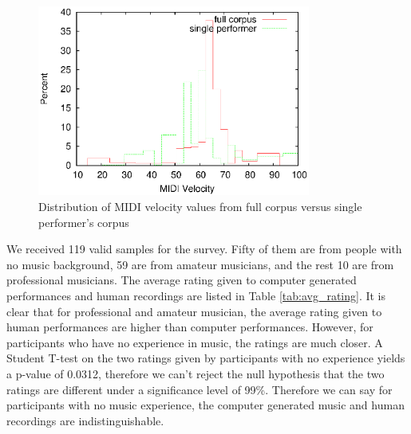 \begin{figure}[tp]
   \begin{center}
      \includegraphics[width=0.8\textwidth]{fig/all_01_velocity}
   \end{center}
   \caption{Distribution of MIDI velocity values from full corpus versus single performer's corpus}
   \label{fig:distvel}
\end{figure}




We received 119 valid samples for the survey. Fifty of them are from people with no music background, 59 are from amateur musicians, and the rest 10 are from professional musicians. The average rating given to computer generated performances and human recordings are listed in Table \ref{tab:avg_rating}. It is clear that for professional and amateur musician, the average rating given to human performances are higher than computer performances. However, for participants who have no experience in music, the ratings are much closer. A Student T-test on the two ratings given by participants with no experience yields a p-value of 0.0312, therefore we can't reject the null hypothesis that the two ratings are different under a significance level of 99\%. Therefore we can say for participants with no music experience, the computer generated music and human recordings are indistinguishable.



